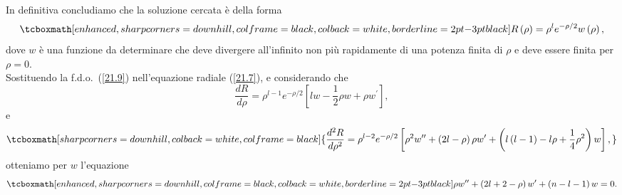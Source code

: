 \documentclass[a4paper,12pt,oneside]{book}
\begin{document}
In definitiva concludiamo che la soluzione cercata è della forma
	\begin{equation}
		\tcboxmath[enhanced, sharp corners=downhill, colframe=black, colback=white, borderline={2pt}{-3pt}{black}]{
			R\left(\rho\right)=\rho^le^{-\rho/2}w\left(\rho\right) ,
			}
	\label{21.9}
	\end{equation}
dove $w$ è una funzione da determinare che deve divergere all'infinito non più rapidamente di una potenza finita di $\rho$ e deve essere finita per $\rho=0$.\\

Sostituendo la f.d.o.~(\ref{21.9}) nell'equazione radiale (\ref{21.7}), e considerando che 
	\begin{equation}
		\frac{dR}{d\rho}=\rho^{l-1}e^{-\rho/2}[lw-\frac{1}{2}\rho w+\rho w^\prime] ,
	\end{equation}
e
	\begin{equation}
		\tcboxmath[sharp corners=downhill, colback=white, colframe=black]{
			\frac{d^2R}{d\rho^2}=\rho^{l-2}e^{-\rho/2}\left[\rho^2w^{\prime\prime}+\left(2l-\rho\right)\rho w^\prime+\left(l\left(l-1\right)-l\rho+\frac{1}{4}\rho^2\right)w\right] ,
			}
	\end{equation}
otteniamo per $w$ l'equazione
	\begin{equation}
		\tcboxmath[enhanced, sharp corners=downhill, colframe=black, colback=white, borderline={2pt}{-3pt}{black}]{
			\rho w^{\prime\prime}+\left(2l+2-\rho\right)w^\prime+\left(n-l-1\right)w=0 .
			}
	\end{equation}\\
	
\end{document}
